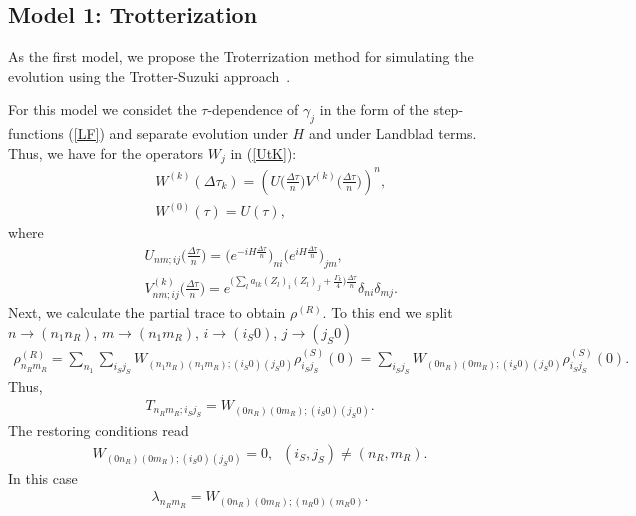 \documentclass[pra,preprint,showpacs]{revtex4-1}
\begin{document}
\subsection{Model 1: Trotterization}
\label{Section:Trot}
As the first model, we propose the Troterrization method for simulating the evolution using the Trotter-Suzuki approach~\cite{Trotter,Suzuki}.
{For this model we considet the $\tau$-dependence of  $\gamma_j$ in the form of the  step-functions (\ref{LF})
and separate evolution under $H$ and under Landblad terms. Thus, we have for the operators $W_j$ in (\ref{UtK}): %
\begin{eqnarray}\label{Wk}
&&
W^{(k)}(\Delta\tau_k) =
\left(U\Big(\frac{\Delta \tau}{n}\Big) V^{(k)}\Big(\frac{\Delta \tau}{n}\Big)\right)^n ,\\\nonumber
&&
W^{(0)}(\tau) =U(\tau),
\end{eqnarray}
where
\begin{eqnarray}\label{UV}
&&
U_{nm;ij}\Big(\frac{\Delta \tau}{n}\Big) = \Big(e^{ -i H\frac{\Delta \tau}{n}} \Big)_{ni}\Big(e^{ i H\frac{\Delta \tau}{n}} \Big)_{jm}  ,\\\nonumber
&&
V^{(k)}_{nm;ij}\Big(\frac{\Delta \tau}{n}\Big) = e^{ \Big( \sum_l a_{lk} (Z_l )_i  (Z_l)_{j}  +\frac{\Gamma_k}{4}\Big)    \frac{\Delta \tau}{n}} \delta_{ni}\delta_{mj}.
\end{eqnarray}
%
Next, we calculate the partial trace to obtain $\rho^{(R)}$. To this end we split $n\to (n_1 n_R)$, $m\to (n_1 m_R)$, $i\to (i_S 0)$,  $j\to (j_S 0)$
\begin{eqnarray}
\rho^{(R)}_{n_Rm_R} =\sum_{n_1} \sum_{i_Sj_S}W_{(n_1 n_R)(n_1m_R);(i_S0)(j_S0)} \rho^{(S)}_{i_Sj_S}(0) =\sum_{i_Sj_S}W_{(0 n_R)(0m_R);(i_S0)(j_S0)}  \rho^{(S)}_{i_Sj_S}(0) .
\end{eqnarray}
Thus,
\begin{eqnarray}
T_{n_Rm_R;i_Sj_S} = W_{(0 n_R)(0m_R);(i_S0)(j_S0)} .
\end{eqnarray}
The restoring conditions read
\begin{eqnarray}
W_{(0 n_R)(0m_R);(i_S0)(j_S0)}=0, \;\;(i_S,j_S)\neq (n_R,m_R) .
\end{eqnarray}
In this case
\begin{eqnarray}
\lambda_{n_Rm_R} =W_{(0 n_R)(0m_R);(n_R0)(m_R0)}.
\end{eqnarray}


}
\end{document}
